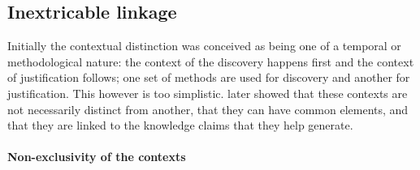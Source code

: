\documentclass[a4paper]{article}
\begin{document}
\subsection{Inextricable linkage}

Initially the contextual distinction was conceived as being one of a temporal
or methodological nature: the context of the discovery happens first and the
context of justification follows; one set of methods are used for discovery
and another for justification. This however is too simplistic.
\cite{kuhn1970structure} later showed that these contexts are not necessarily
distinct from another, that they can have common elements, and that they are
linked to the knowledge claims that they help generate. 

\paragraph{Non-exclusivity of the contexts}
\label{part}
\end{document}
